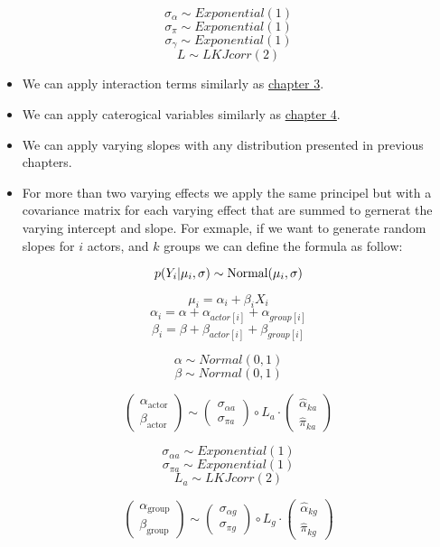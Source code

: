 \documentclass[
  letterpaper,
  DIV=11,
  numbers=noendperiod]{scrreprt}
\begin{document}
\begin{tcolorbox}
\[
\sigma_{\alpha} \sim Exponential(1)
\] \[
\sigma_{\pi} \sim Exponential(1)
\] \[
\sigma_{\gamma} \sim Exponential(1) 
\] \[
L \sim LKJcorr(2)
\]

\begin{itemize}
\item
  We can apply interaction terms similarly as
  \href{/3.\%20Interaction\%20between\%20continuous\%20variables.qmd}{chapter
  3}.
\item
  We can apply caterogical variables similarly as
  \href{4.\%20Categorical\%20variable.qmd}{chapter 4}.
\item
  We can apply varying slopes with any distribution presented in
  previous chapters.
\item
  For more than two varying effects we apply the same principel but with
  a covariance matrix for each varying effect that are summed to
  gernerat the varying intercept and slope. For exmaple, if we want to
  generate random slopes for \(i\) actors, and \(k\) groups we can
  define the formula as follow:
\end{itemize}

\[
p(Y_{i} |\mu_i , \sigma) \sim \text{Normal}(\mu_i , \sigma) \\
\]

\[
\mu_i =   \alpha_i + \beta_{i} X_i 
\] \[
\alpha_i = \alpha + \alpha_{actor[i]} + \alpha_{group[i]}
\] \[
\beta_{i} = \beta + \beta_{actor[i]} + \beta_{group[i]} 
\]

\[
\alpha \sim Normal(0,1)
\] \[
\beta \sim Normal(0,1) 
\]

\[ 
\begin{pmatrix} 
\alpha_{\text{actor}} \\ 
\beta_{\text{actor}} 
\end{pmatrix} 
\sim 
\begin{pmatrix} 
\sigma_{\alpha a} \\ 
\sigma_{\pi a} 
\end{pmatrix} \circ L_a \cdot \begin{pmatrix} 
\widehat{\alpha}_{ka} \\ 
\widehat{\pi}_{ka} 
\end{pmatrix} 
\]

\[
\sigma_{\alpha a} \sim Exponential(1)
\] \[
\sigma_{\pi a} \sim Exponential(1)
\] \[
L_{a} \sim LKJcorr(2)
\]

\[ 
\begin{pmatrix} 
\alpha_{\text{group}} \\ 
\beta_{\text{group}} 
\end{pmatrix} 
\sim  
\begin{pmatrix} 
\sigma_{\alpha g} \\ 
\sigma_{\pi g} 
\end{pmatrix} \circ L_g \cdot 
\begin{pmatrix} 
\widehat{\alpha}_{kg} \\ 
\widehat{\pi}_{kg} 
\end{pmatrix} 
\]


\end{tcolorbox}
\end{document}
